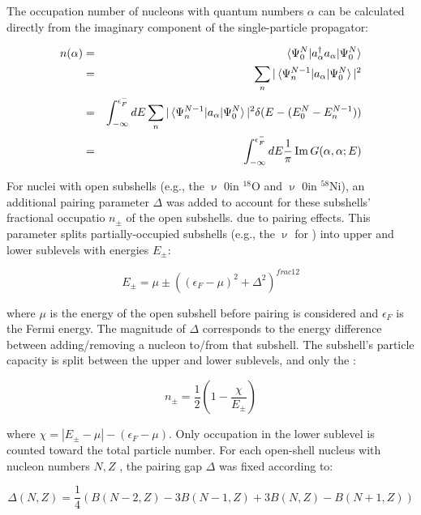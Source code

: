 The occupation number of nucleons with quantum numbers $\alpha$ can be
calculated directly from the imaginary component of the single-particle
propagator:

\begin{eqnarray}
    n(\alpha)
    & = & \braket{\Psi^{N}_{0}|a^{\dagger}_{\alpha}a_{\alpha}|\Psi^{N}_{0}}\\
    & = & \sum_{n}|\braket{\Psi^{N-1}_{n}|a_{\alpha}|\Psi^{N}_{0}}|^{2}\\
    & = & \int_{-\infty}^{\epsilon_{F}^{-}} dE
\sum_{n}|\braket{\Psi^{N-1}_{n}|a_{\alpha}|\Psi^{N}_{0}}|^{2}
\delta(E-(E^{N}_{0}-E^{N-1}_{n}))\\
& = & \int_{-\infty}^{\epsilon_{F}^{-}} dE \frac{1}{\pi}\operatorname{Im}G(\alpha,\alpha;E)
\end{eqnarray}


For nuclei with open subshells (e.g., the $\upnu$ 0\dFive in $^{18}$O and
$\upnu$ 0\fFive in $^{58}$Ni), an additional
pairing parameter $\Delta$ was added to
account for these subshells' fractional occupatio $n_{\pm}$ of the open subshells. due to pairing
effects. This parameter splits partially-occupied subshells (e.g., the $\upnu$\dFive
for \oEight) into upper and lower sublevels with energies $E_{\pm}$:

\begin{equation}
    E_{\pm} = \mu \pm ((\epsilon_{F}-\mu)^{2} + \Delta^{2})^{frac{1}{2}}
\end{equation}

where $\mu$ is the energy of the open subshell before pairing is considered and
$\epsilon_{F}$ is the Fermi
energy. The magnitude of $\Delta$ corresponds to the energy difference between
adding/removing a nucleon to/from that subshell. The subshell's particle
capacity is split between the upper and lower sublevels, and only the :

\begin{equation}
    n_{\pm} = \frac{1}{2}\left( 1-\frac{\chi}{E_{\pm}}\right)
\end{equation}

where $\chi = |E_{\pm}-\mu| - (\epsilon_{F} - \mu)$. Only occupation in the
lower sublevel is counted toward the total particle number. For each open-shell
nucleus with nucleon numbers $N, Z$ , the pairing gap $\Delta$ was fixed according to:

\begin{equation}
    \Delta(N,Z) = \frac{1}{4}\left(B(N-2,Z)-3B(N-1,Z) + 3B(N,Z)-B(N+1,Z)\right)
\end{equation}

